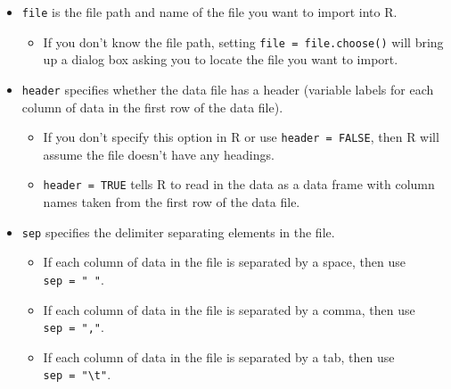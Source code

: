 \documentclass[
]{book}
\providecommand{\tightlist}{%
  \setlength{\itemsep}{0pt}\setlength{\parskip}{0pt}}
\theoremstyle{definition}
\theoremstyle{definition}
\theoremstyle{definition}
\theoremstyle{definition}
\theoremstyle{remark}
\begin{document}
\begin{itemize}
\tightlist
\item
  \texttt{file} is the file path and name of the file you want to import into R.

  \begin{itemize}
  \tightlist
  \item
    If you don't know the file path, setting \texttt{file\ =\ file.choose()} will bring up a dialog box asking you to locate the file you want to import.
  \end{itemize}
\item
  \texttt{header} specifies whether the data file has a header (variable labels for each column of data in the first row of the data file).

  \begin{itemize}
  \tightlist
  \item
    If you don't specify this option in R or use \texttt{header\ =\ FALSE}, then R will assume the file doesn't have any headings.
  \item
    \texttt{header\ =\ TRUE} tells R to read in the data as a data frame with column names taken from the first row of the data file.
  \end{itemize}
\item
  \texttt{sep} specifies the delimiter separating elements in the file.

  \begin{itemize}
  \tightlist
  \item
    If each column of data in the file is separated by a space, then use \texttt{sep\ =\ "\ "}.
  \item
    If each column of data in the file is separated by a comma, then use \texttt{sep\ =\ ","}.
  \item
    If each column of data in the file is separated by a tab, then use \texttt{sep\ =\ "\textbackslash{}t"}.
  \end{itemize}
\end{itemize}
\end{document}
